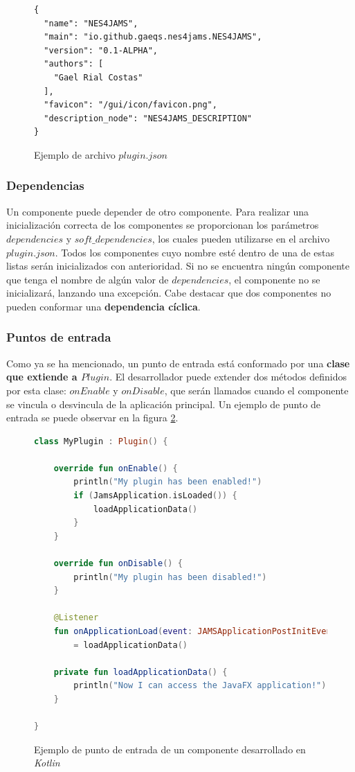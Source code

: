 \begin{figure}[h]
    \centering
    \begin{lstlisting}[frame=single,label={lst:plugin-json}]
{
  "name": "NES4JAMS",
  "main": "io.github.gaeqs.nes4jams.NES4JAMS",
  "version": "0.1-ALPHA",
  "authors": [
    "Gael Rial Costas"
  ],
  "favicon": "/gui/icon/favicon.png",
  "description_node": "NES4JAMS_DESCRIPTION"
}
    \end{lstlisting}
    \caption{Ejemplo de archivo $plugin.json$}
    \label{fig:plugin-json}
\end{figure}

\subsubsection{Dependencias}\label{subsubsec:dependencias}

Un componente puede depender de otro componente.
Para realizar una inicialización correcta de los componentes
se proporcionan los parámetros $dependencies$
y $soft\_dependencies$, los cuales pueden utilizarse en
el archivo $plugin.json$.
Todos los componentes cuyo nombre esté dentro de una de estas
listas serán inicializados con anterioridad.
Si no se encuentra ningún componente que tenga el nombre
de algún valor de $dependencies$, el componente no
se inicializará, lanzando una excepción.
Cabe destacar que dos componentes no pueden conformar
una \textbf{dependencia cíclica}.

\subsubsection{Puntos de entrada}\label{subsubsec:puntos-de-entrada}

Como ya se ha mencionado, un punto de entrada está conformado
por una \textbf{clase que extiende a $Plugin$}.
El desarrollador puede extender dos métodos definidos por esta clase:
$onEnable$ y $onDisable$, que serán llamados cuando el
componente se vincula o desvincula de la aplicación principal.
Un ejemplo de punto de entrada se puede observar en la figura \ref{fig:entry-point}.

\begin{figure}[h]
    \centering
    \begin{lstlisting}[frame=single,label={lst:entry-point},language=Kotlin]
class MyPlugin : Plugin() {

    override fun onEnable() {
        println("My plugin has been enabled!")
        if (JamsApplication.isLoaded()) {
            loadApplicationData()
        }
    }

    override fun onDisable() {
        println("My plugin has been disabled!")
    }

    @Listener
    fun onApplicationLoad(event: JAMSApplicationPostInitEvent)
        = loadApplicationData()

    private fun loadApplicationData() {
        println("Now I can access the JavaFX application!")
    }

}
    \end{lstlisting}
    \caption{Ejemplo de punto de entrada de un componente desarrollado en \textit{Kotlin}}
    \label{fig:entry-point}
\end{figure}

